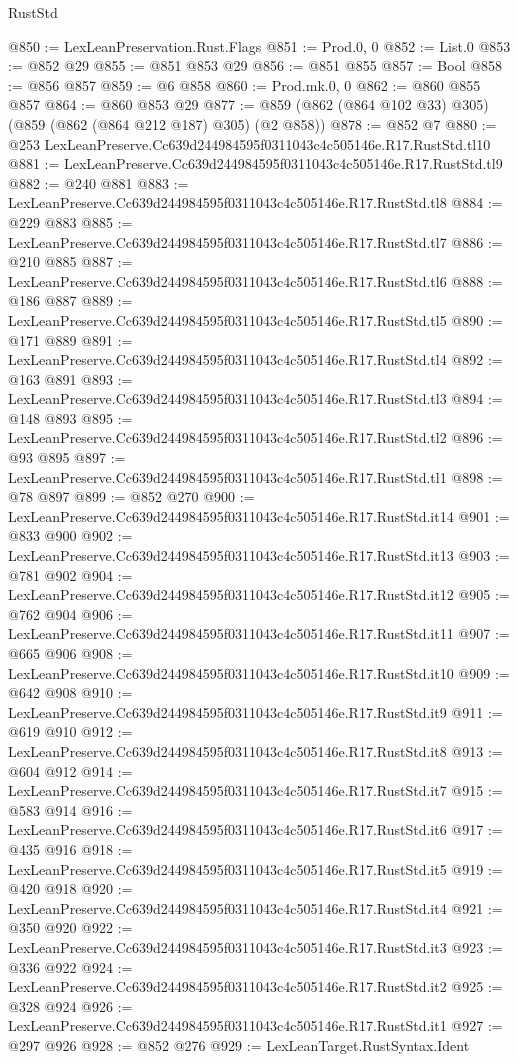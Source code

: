 \begin{lexlean}{RustStd}
\begin{coremodule}
@850 := LexLeanPreservation.Rust.Flags
@851 := Prod.{0, 0}
@852 := List.{0}
@853 := @852 @29
@855 := @851 @853 @29
@856 := @851 @855
@857 := Bool
@858 := @856 @857
@859 := @6 @858
@860 := Prod.mk.{0, 0}
@862 := @860 @855 @857
@864 := @860 @853 @29
@877 := @859 (@862 (@864 @102 @33) @305) (@859 (@862 (@864 @212 @187) @305) (@2 @858))
@878 := @852 @7
@880 := @253 LexLeanPreserve.Cc639d244984595f0311043c4c505146e.R17.RustStd.tl10
@881 := LexLeanPreserve.Cc639d244984595f0311043c4c505146e.R17.RustStd.tl9
@882 := @240 @881
@883 := LexLeanPreserve.Cc639d244984595f0311043c4c505146e.R17.RustStd.tl8
@884 := @229 @883
@885 := LexLeanPreserve.Cc639d244984595f0311043c4c505146e.R17.RustStd.tl7
@886 := @210 @885
@887 := LexLeanPreserve.Cc639d244984595f0311043c4c505146e.R17.RustStd.tl6
@888 := @186 @887
@889 := LexLeanPreserve.Cc639d244984595f0311043c4c505146e.R17.RustStd.tl5
@890 := @171 @889
@891 := LexLeanPreserve.Cc639d244984595f0311043c4c505146e.R17.RustStd.tl4
@892 := @163 @891
@893 := LexLeanPreserve.Cc639d244984595f0311043c4c505146e.R17.RustStd.tl3
@894 := @148 @893
@895 := LexLeanPreserve.Cc639d244984595f0311043c4c505146e.R17.RustStd.tl2
@896 := @93 @895
@897 := LexLeanPreserve.Cc639d244984595f0311043c4c505146e.R17.RustStd.tl1
@898 := @78 @897
@899 := @852 @270
@900 := LexLeanPreserve.Cc639d244984595f0311043c4c505146e.R17.RustStd.it14
@901 := @833 @900
@902 := LexLeanPreserve.Cc639d244984595f0311043c4c505146e.R17.RustStd.it13
@903 := @781 @902
@904 := LexLeanPreserve.Cc639d244984595f0311043c4c505146e.R17.RustStd.it12
@905 := @762 @904
@906 := LexLeanPreserve.Cc639d244984595f0311043c4c505146e.R17.RustStd.it11
@907 := @665 @906
@908 := LexLeanPreserve.Cc639d244984595f0311043c4c505146e.R17.RustStd.it10
@909 := @642 @908
@910 := LexLeanPreserve.Cc639d244984595f0311043c4c505146e.R17.RustStd.it9
@911 := @619 @910
@912 := LexLeanPreserve.Cc639d244984595f0311043c4c505146e.R17.RustStd.it8
@913 := @604 @912
@914 := LexLeanPreserve.Cc639d244984595f0311043c4c505146e.R17.RustStd.it7
@915 := @583 @914
@916 := LexLeanPreserve.Cc639d244984595f0311043c4c505146e.R17.RustStd.it6
@917 := @435 @916
@918 := LexLeanPreserve.Cc639d244984595f0311043c4c505146e.R17.RustStd.it5
@919 := @420 @918
@920 := LexLeanPreserve.Cc639d244984595f0311043c4c505146e.R17.RustStd.it4
@921 := @350 @920
@922 := LexLeanPreserve.Cc639d244984595f0311043c4c505146e.R17.RustStd.it3
@923 := @336 @922
@924 := LexLeanPreserve.Cc639d244984595f0311043c4c505146e.R17.RustStd.it2
@925 := @328 @924
@926 := LexLeanPreserve.Cc639d244984595f0311043c4c505146e.R17.RustStd.it1
@927 := @297 @926
@928 := @852 @276
@929 := LexLeanTarget.RustSyntax.Ident

\end{coremodule}
\end{lexlean}
